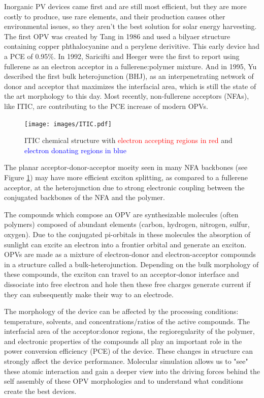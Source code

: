 Inorganic PV devices came first and are still most efficient, but they are more costly to produce, use rare elements, and their production causes other environmental issues, so they aren't the best solution for solar energy harvesting. 
The first OPV was created by Tang in 1986 and used a bilyaer structure containing copper phthalocyanine and a perylene derivitive\cite{Tang1986b}. 
This early device had a PCE of 0.95\%.
In 1992, Saricifti and Heeger were the first to report using fullerene as an electron acceptor in a fullerene:polymer mixture\cite{Saricifti1992}.
And in 1995, Yu described the first bulk heterojunction (BHJ), as an interpenetrating network of donor and acceptor that maximizes the interfacial area, which is still the state of the art morphology to this day\cite{Yu1995}.
Most recently, non-fullerene acceptors (NFAs), like ITIC, are contributing to the PCE increase of modern OPVs\cite{S.Gurney2019}.

\begin{figure}
    \centering
    \texttt{[image: images/ITIC.pdf]}
    \caption{ITIC chemical structure with \textcolor{red}{electron accepting regions in red} and \textcolor{blue}{electron donating regions in blue}}
    \label{fig:itic}
\end{figure}

The planar acceptor-donor-acceptor moeity seen in many NFA backbones (see Figure \ref{fig:itic}) may have more efficient exciton splitting, as compared to a fullerene acceptor, at the heterojunction due to strong electronic coupling between the conjugated backbones of the NFA and the polymer\cite{Yi2018}.

The compounds which compose an OPV are synthesizable molecules (often polymers) composed of abundant elements (carbon, hydrogen, nitrogen, sulfur, oxygen).
Due to the conjugated pi-orbitals in these molecules the absorption of sunlight can excite an electron into a frontier orbital and generate an exciton.
OPVs are made as a mixture of electron-donor and electron-acceptor compounds in a structure called a bulk-heterojunction.
Depending on the bulk morphology of these compounds, the exciton can travel to an acceptor-donor interface and dissociate into free electron and hole then these free charges generate current if they can subsequently make their way to an electrode.

The morphology of the device can be affected by the processing conditions: temperature, solvents, and concentrations/ratios of the active compounds\cite{Ma2005,Hoppe2004a,Li2007}.
The interfacial area of the acceptor:donor regions\cite{Mazzio2015}, the regioregularity of the polymer\cite{Kim2006}, and electronic properties of the compounds\cite{Scharber2006a} all play an important role in the power conversion efficiency (PCE) of the device. 
These changes in structure can strongly affect the device performance.
Molecular simulation allows us to "see" these atomic interaction and gain a deeper view into the driving forces behind the self assembly of these OPV morphologies and to understand what conditions create the best devices.

